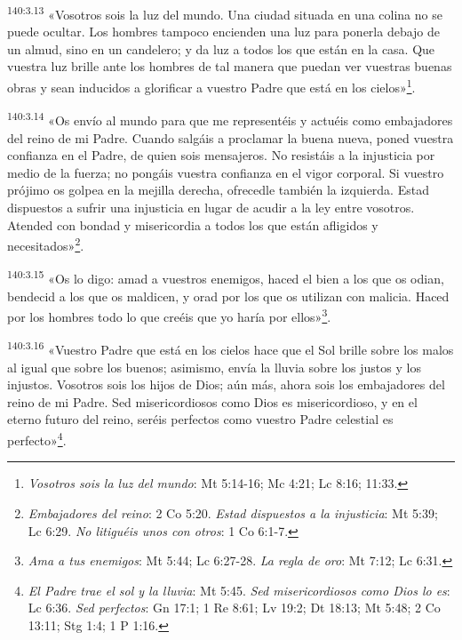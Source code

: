 \par 
\textsuperscript{140:3.13} «Vosotros sois la luz del mundo. Una ciudad situada en una colina no se puede ocultar. Los hombres tampoco encienden una luz para ponerla debajo de un almud, sino en un candelero; y da luz a todos los que están en la casa. Que vuestra luz brille ante los hombres de tal manera que puedan ver vuestras buenas obras y sean inducidos a glorificar a vuestro Padre que está en los cielos»\footnote{\textit{Vosotros sois la luz del mundo}: Mt 5:14-16; Mc 4:21; Lc 8:16; 11:33.}.

\par 
\textsuperscript{140:3.14} «Os envío al mundo para que me representéis y actuéis como embajadores del reino de mi Padre. Cuando salgáis a proclamar la buena nueva, poned vuestra confianza en el Padre, de quien sois mensajeros. No resistáis a la injusticia por medio de la fuerza; no pongáis vuestra confianza en el vigor corporal. Si vuestro prójimo os golpea en la mejilla derecha, ofrecedle también la izquierda. Estad dispuestos a sufrir una injusticia en lugar de acudir a la ley entre vosotros. Atended con bondad y misericordia a todos los que están afligidos y necesitados»\footnote{\textit{Embajadores del reino}: 2 Co 5:20. \textit{Estad dispuestos a la injusticia}: Mt 5:39; Lc 6:29. \textit{No litiguéis unos con otros}: 1 Co 6:1-7.}.

\par 
\textsuperscript{140:3.15} «Os lo digo: amad a vuestros enemigos, haced el bien a los que os odian, bendecid a los que os maldicen, y orad por los que os utilizan con malicia. Haced por los hombres todo lo que creéis que yo haría por ellos»\footnote{\textit{Ama a tus enemigos}: Mt 5:44; Lc 6:27-28. \textit{La regla de oro}: Mt 7:12; Lc 6:31.}.

\par 
\textsuperscript{140:3.16} «Vuestro Padre que está en los cielos hace que el Sol brille sobre los malos al igual que sobre los buenos; asimismo, envía la lluvia sobre los justos y los injustos. Vosotros sois los hijos de Dios; aún más, ahora sois los embajadores del reino de mi Padre. Sed misericordiosos como Dios es misericordioso, y en el eterno futuro del reino, seréis perfectos como vuestro Padre celestial es perfecto»\footnote{\textit{El Padre trae el sol y la lluvia}: Mt 5:45. \textit{Sed misericordiosos como Dios lo es}: Lc 6:36. \textit{Sed perfectos}: Gn 17:1; 1 Re 8:61; Lv 19:2; Dt 18:13; Mt 5:48; 2 Co 13:11; Stg 1:4; 1 P 1:16.}.

